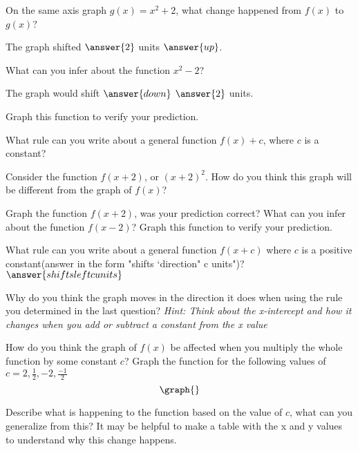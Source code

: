 \documentclass{ximera}
\begin{document}
\begin{question}

On the same axis graph $g(x)=x^2+2$, what change happened from $f(x)$ to $g(x)$?

The graph shifted $\answer{2}$ units $\answer{up}$.

What can you infer about the function $x^2-2$?

The graph would shift $\answer{down}$ $\answer{2}$ units.

Graph this function to verify your prediction.

What rule can you write about a general function $f(x)+c$, where $c$ is a constant?
\begin{freeResponse}
\end{freeResponse}
Consider the function $f(x+2)$, or $(x+2)^2$. How do you think this graph will be different from the graph of $f(x)$?
\begin{freeResponse}
\end{freeResponse}
Graph the function $f(x+2)$, was your prediction correct? What can you infer about the function $f(x-2)$? Graph this function to verify your prediction.
\begin{freeResponse}
\end{freeResponse}
What rule can you write about a general function $f(x+c)$ where $c$ is a positive constant(answer in the form "shifts `direction" c units")?
$\answer{shifts left c units}$

Why do you think the graph moves in the direction it does when using the rule you determined in the last question? \textit{Hint: Think about the x-intercept and how it changes when you add or subtract a constant from the x value}
\begin{freeResponse}
\end{freeResponse}
How do you think the graph of $f(x)$ be affected when you multiply the whole function by some constant $c$? Graph the function for the following values of $c=2,\frac{1}{2},-2,\frac{-1}{2}$
\[
\graph{}
\]
\begin{freeResponse}
\end{freeResponse}
Describe what is happening to the function based on the value of $c$, what can you generalize from this? It may be helpful to make a table with the x and y values to understand why this change happens.
\begin{freeResponse}
\end{freeResponse}
\end{question}
\end{document}
